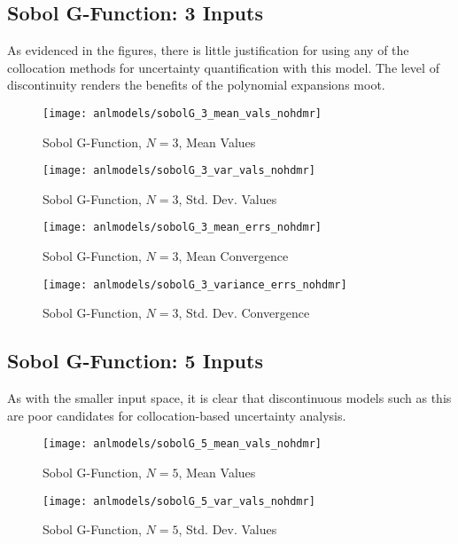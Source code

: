 \subsection{Sobol G-Function: 3 Inputs}
As evidenced in the figures, there is little justification for using any of the collocation methods for
uncertainty quantification with this model.  The level of discontinuity renders the benefits of the polynomial
expansions moot.
\begin{figure}[H]
  \centering
  \texttt{[image: anlmodels/sobolG\_3\_mean\_vals\_nohdmr]}
  \caption{Sobol G-Function, $N=3$, Mean Values}
  \label{fig:sobolG mean values 3}
\end{figure}
\begin{figure}[H]
  \centering
  \texttt{[image: anlmodels/sobolG\_3\_var\_vals\_nohdmr]}
  \caption{Sobol G-Function, $N=3$, Std. Dev. Values}
  \label{fig:sobolG var values 3}
\end{figure}

\begin{figure}[H]
  \centering
  \texttt{[image: anlmodels/sobolG\_3\_mean\_errs\_nohdmr]}
  \caption{Sobol G-Function, $N=3$, Mean Convergence}
  \label{fig:sobolG mean errors 3}
\end{figure}
\begin{figure}[H]
  \centering
  \texttt{[image: anlmodels/sobolG\_3\_variance\_errs\_nohdmr]}
  \caption{Sobol G-Function, $N=3$, Std. Dev. Convergence}
  \label{fig:sobolG var errors 3}
\end{figure}

\subsection{Sobol G-Function: 5 Inputs}
As with the smaller input space, it is clear that discontinuous models such as this are poor candidates for
collocation-based uncertainty analysis.
\begin{figure}[H]
  \centering
  \texttt{[image: anlmodels/sobolG\_5\_mean\_vals\_nohdmr]}
  \caption{Sobol G-Function, $N=5$, Mean Values}
  \label{fig:sobolG mean values 5}
\end{figure}
\begin{figure}[H]
  \centering
  \texttt{[image: anlmodels/sobolG\_5\_var\_vals\_nohdmr]}
  \caption{Sobol G-Function, $N=5$, Std. Dev. Values}
  \label{fig:sobolG var values 5}
\end{figure}

